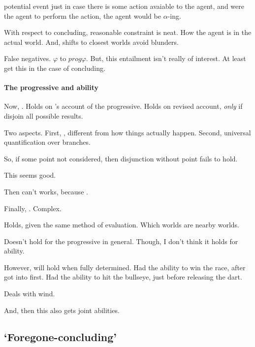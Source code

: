 \begin{note}
  potential event just in case there is some action avaiable to the agent, and were the agent to perform the action, the agent would be \(\alpha\)-ing.
\end{note}

\begin{note}
  With respect to concluding, reasonable constraint is neat.
  How the agent is in the actual world.
  And, shifts to closest worlds avoid blunders.
\end{note}

\begin{note}
  False negatives.
  \(\varphi\) to \(prog \varphi\).
  But, this entailment isn't really of interest.
  At least get this in the case of concluding.
\end{note}

\paragraph{The progressive and ability}

\begin{note}
  Now, \BoyVS{}.
  Holds on \citeauthor{Landman:1992wh}'s account of the progressive.
  Holds on revised account, \emph{only} if disjoin all possible results.

  Two aspects.
  First, \AlgGetPStops{}, different from how things actually happen.
  Second, universal quantification over branches.

  So, if some point not considered, then disjunction without point fails to hold.

  This seems good.

  Then can't works, because \AlgGetPStops{}.

  Finally, \BoyPS{}.
  Complex.

  Holds, given the same method of evaluation.
  Which worlds are nearby worlds.

  Doesn't hold for the progressive in general.
  Though, I don't think it holds for ability.

  However, will hold when fully determined.
  Had the ability to win the race, after got into first.
  Had the ability to hit the bullseye, just before releasing the dart.

  Deals with wind.

  And, then this also gets joint abilities.
\end{note}

\subsection{`Foregone-concluding'}
\label{sec:fc-progressive}

